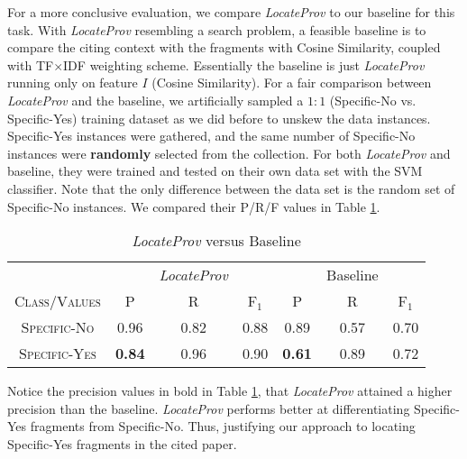 For a more conclusive evaluation, we compare \textit{LocateProv} to our baseline for this task. With \textit{LocateProv} resembling a search problem, a feasible baseline is to compare the citing context with the fragments with Cosine Similarity, coupled with TF$\times$IDF \cite{irtextbook} weighting scheme. Essentially the baseline is just \textit{LocateProv} running only on feature $I$ (Cosine Similarity). For a fair comparison between \textit{LocateProv} and the baseline, we artificially sampled a $1:1$ (Specific-No vs. Specific-Yes) training dataset as we did before to unskew the data instances. Specific-Yes instances were gathered, and the same number of Specific-No instances were \textbf{randomly} selected from the collection. For both \textit{LocateProv} and baseline, they were trained and tested on their own data set with the SVM classifier. Note that the only difference between the data set is the random set of Specific-No instances. We compared their P/R/F values in Table \ref{tab:locateprov_vs_baseline}.

\begin{table}[h]
	\center
	\begin{tabular}{ c | c  c  c | c c c }
		& & {\it LocateProv} & & & Baseline \\
		\textsc{Class/Values} & \textsc{P} & \textsc{R} & \textsc{F$_1$} & \textsc{P} & \textsc{R} & \textsc{F$_1$}  \\
		\hline
		\textsc{Specific-No} 			& 0.96  &    0.82   &   0.88 & 0.89   &   0.57   &   0.70 \\
		\textsc{Specific-Yes} 			& {\bf 0.84}  &    0.96   &   0.90 & {\bf 0.61}   &   0.89   &   0.72 \\
	\end{tabular}
	\caption{{\it LocateProv} versus Baseline}
	\label{tab:locateprov_vs_baseline}
\end{table}
Notice the precision values in bold in Table \ref{tab:locateprov_vs_baseline}, that {\it LocateProv} attained a higher precision than the baseline. {\it LocateProv} performs better at differentiating Specific-Yes fragments from Specific-No. Thus, justifying our approach to locating Specific-Yes fragments in the cited paper.
